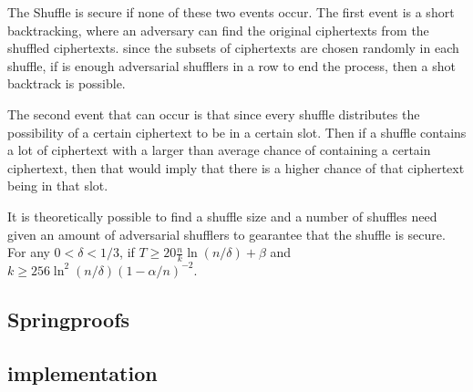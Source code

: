 The Shuffle is secure if none of these two events occur.
The first event is a short backtracking, where an adversary can find the original ciphertexts from the shuffled ciphertexts.
since the subsets of ciphertexts are chosen randomly in each shuffle, if is enough adversarial shufflers in a row to end the process, then a shot backtrack is possible.

The second event that can occur is that since every shuffle distributes the possibility of a certain ciphertext to be in a certain slot.
Then if a shuffle contains a lot of ciphertext with a larger than average chance of containing a certain ciphertext, then that would imply that there is a higher chance of that ciphertext being in that slot.

It is theoretically possible to find a shuffle size and a number of shuffles need given an amount of adversarial shufflers to gearantee that the shuffle is secure.
For any $0 < \delta < 1/3$, if $T \geq 20 \frac{n}{k} \ln(n/\delta) + \beta $ and $ k \geq 256 \ln^2(n/\delta)(1 - \alpha/n)^{-2}$.



\subsection{Springproofs}\label{sec:approach-springproofs}



\subsection{implementation}\label{sec:approach-implementation}


